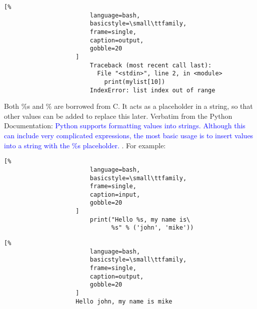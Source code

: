 \documentclass[crop=false,class=book,oneside]{standalone}
\begin{document}
                \begin{minipage}[t]{.48\textwidth}
                    \centering
                    \begin{lstlisting}[%
                        language=bash,
                        basicstyle=\small\ttfamily,
                        frame=single,
                        caption=output,
                        gobble=20
                    ]
                        Traceback (most recent call last):
                          File "<stdin>", line 2, in <module>
                            print(mylist[10])
                        IndexError: list index out of range
                    \end{lstlisting}
                \end{minipage}
                Both \%s and \% are borrowed from C. It acts as a
                placeholder in a string, so that other values can be
                added to replace this later. Verbatim from the Python
                Documentation:\newline
                \textcolor{blue}{%
                    Python supports formatting values into strings.
                    Although this can include very complicated
                    expressions, the most basic usage is to insert
                    values into a string with the \%s placeholder.
                }.\newline
                For example:\newline
                \begin{minipage}[t]{.48\textwidth}
                    \centering
                    \begin{lstlisting}[%
                        language=bash,
                        basicstyle=\small\ttfamily,
                        frame=single,
                        caption=input,
                        gobble=20
                    ]
                        print("Hello %s, my name is\
                              %s" % ('john', 'mike'))
                    \end{lstlisting}
                \end{minipage}\hfill
                \begin{minipage}[t]{.48\textwidth}
                    \centering
                    \begin{lstlisting}[%
                        language=bash,
                        basicstyle=\small\ttfamily,
                        frame=single,
                        caption=output,
                        gobble=20
                    ]
                    Hello john, my name is mike
                    \end{lstlisting}
                \end{minipage}
\end{document}
